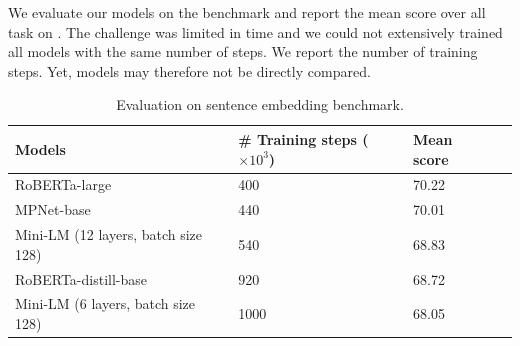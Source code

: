 We evaluate our models on the benchmark and report the mean score over all task on . The challenge was limited in time and we could not extensively trained all models with the same number of steps. We report the number of training steps. Yet, models may therefore not be directly compared.

\begin{table}[!htb]
\centering
\small
\begin{tabularx}{\textwidth}{@{}lYYY@{} }
\toprule
\textbf{Models} & \textbf{\# Training steps} ($\times 10^3$) & \textbf{Mean score} \\
\midrule
\midrule 
RoBERTa-large & 400 & 70.22 \\
MPNet-base & 440 & 70.01 \\ %
Mini-LM (12 layers, batch size 128) & 540 & 68.83 \\ %
RoBERTa-distill-base & 920 & 68.72 \\
Mini-LM (6 layers, batch size 128) & \num{1000} & 68.05 \\ %
\bottomrule
\end{tabularx}
\caption{Evaluation on sentence embedding benchmark.}
\end{table}



